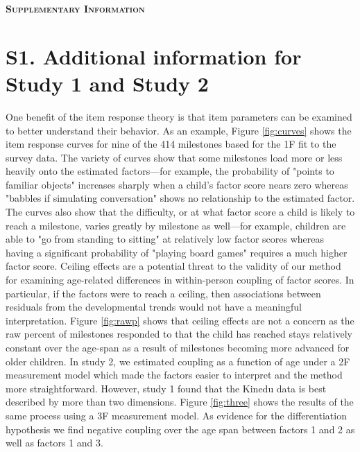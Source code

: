 \documentclass{article}
\begin{document}
\begin{center}
\textbf{\textsc{\LARGE Supplementary Information}}\\
\end{center}

\section{S1. Additional information for Study 1 and Study 2}

One benefit of the item response theory is that item parameters can be examined to better understand their behavior. As an example, Figure \ref{fig:curves} shows the item response curves for nine of the 414 milestones based for the 1F fit to the survey data. The variety of curves show that some milestones load more or less heavily onto the estimated factors—for example, the probability of "points to familiar objects" increases sharply when a child's factor score nears zero whereas "babbles if simulating conversation" shows no relationship to the estimated factor. The curves also show that the difficulty, or at what factor score a child is likely to reach a milestone, varies greatly by milestone as well—for example, children are able to "go from standing to sitting" at relatively low factor scores whereas having a significant probability of "playing board games" requires a much higher factor score.
Ceiling effects are a potential threat to the validity of our method for examining age-related differences in within-person coupling of factor scores. In particular, if the factors were to reach a ceiling, then associations between residuals from the developmental trends would not have a meaningful interpretation. Figure \ref{fig:rawp} shows that ceiling effects are not a concern as the raw percent of milestones responded to that the child has reached stays relatively constant over the age-span as a result of milestones becoming more advanced for older children.
In study 2, we estimated coupling as a function of age under a 2F measurement model which made the factors easier to interpret and the method more straightforward. However, study 1 found that the Kinedu data is best described by more than two dimensions. Figure \ref{fig:three} shows the results of the same process using a 3F measurement model. As evidence for the differentiation hypothesis we find negative coupling over the age span between factors 1 and 2 as well as factors 1 and 3.
\end{document}
